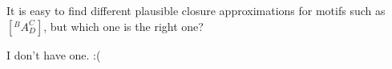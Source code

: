 It is easy to find different plausible closure approximations for motifs such as $[^BA^C_D]$, but which one is the right one?

\solution
I don't have one. :(

\solutionend


